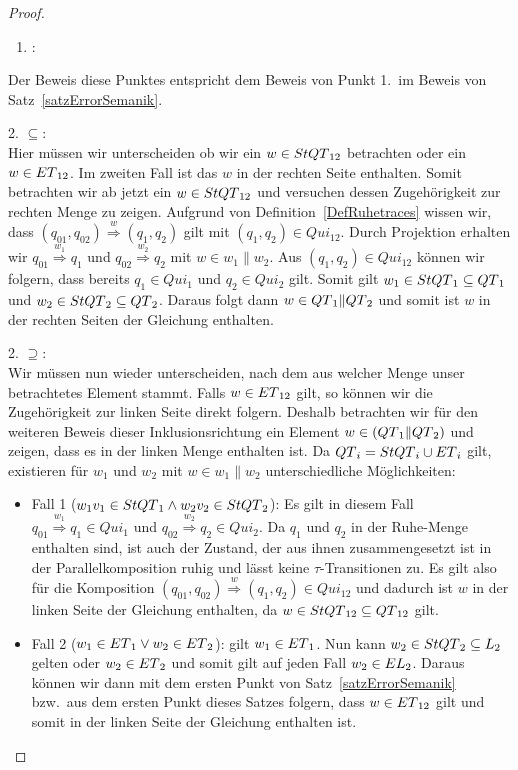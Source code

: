 \begin{proof}
  ~
  \begin{enumerate}
    \item \hspace{-0.2cm}:
  \end{enumerate}
  \vspace{-0.3cm}
  Der Beweis diese Punktes entspricht dem Beweis von Punkt 1.\ im Beweis von
  Satz~\ref{satzErrorSemanik}.

  2. \glqq $\subseteq$\grqq :\\
  Hier müssen wir unterscheiden ob wir ein $w\in StQT{}_{12}$ betrachten oder
  ein $w\in ET{}_{12}$. Im zweiten Fall ist das $w$ in der rechten Seite
  enthalten. Somit betrachten wir ab jetzt ein
  $w\in StQT{}_{12}$ und versuchen dessen Zugehörigkeit zur rechten Menge zu
  zeigen. Aufgrund von Definition~\ref{DefRuhetraces} wissen wir, dass
  $(q_{01},q_{02}) \overset{w}{\Rightarrow} (q_1,q_2)$ gilt mit $(q_1,q_2)\in
  Qui_{12}$. Durch Projektion erhalten wir $q_{01} \overset{w_1}{\Rightarrow}
  q_1$ und $q_{02} \overset{w_2}{\Rightarrow} q_2$ mit $w\in w_1\|w_2$. Aus
  $(q_1,q_2)\in Qui_{12}$ können wir folgern, dass bereits $q_1\in Qui_1$ und
  $q_2\in Qui_2$ gilt. Somit gilt $w_1\in StQT{}_1\subseteq QT{}_1$ und
  $w_2\in StQT{}_2\subseteq QT{}_2$. Daraus folgt dann $w\in
  QT{}_1\|QT{}_2$ und somit ist $w$ in der rechten Seiten der Gleichung
  enthalten.

  2. \glqq $\supseteq$\grqq :\\
  Wir müssen nun wieder unterscheiden, nach dem aus welcher Menge unser
  betrachtetes Element stammt. Falls $w\in ET{}_{12}$ gilt, so können wir die
  Zugehörigkeit zur linken Seite direkt folgern. Deshalb betrachten wir für den
  weiteren Beweis dieser Inklusionsrichtung ein Element $w\in
  (QT{}_1\|QT{}_2)$ und zeigen, dass es in der linken Menge enthalten ist. Da
  $QT{}_i = StQT{}_i\cup ET{}_i$ gilt, existieren für $w_1$ und $w_2$ mit
  $w\in w_1\| w_2$ unterschiedliche Möglichkeiten:
  \begin{itemize}
    \item Fall 1 ($w_1v_1\in StQT{}_1\wedge w_2v_2\in StQT{}_2$): Es gilt in
      diesem Fall $q_{01} \overset{w_1}{\Rightarrow} q_1\in Qui_1$ und $q_{02}
      \overset{w_2}{\Rightarrow} q_2\in Qui_2$. Da $q_1$ und $q_2$ in der
      Ruhe-Menge enthalten sind, ist auch der Zustand, der aus ihnen
      zusammengesetzt ist in der Parallelkomposition ruhig und lässt keine
      $\tau$-Transitionen zu. Es gilt also für die Komposition $(q_{01},q_{02})
      \overset{w}{\Rightarrow} (q_1,q_2)\in Qui_{12}$ und dadurch ist $w$ in
      der linken Seite der Gleichung enthalten, da $w\in StQT{}_{12}\subseteq
      QT{}_{12}$ gilt.
    \item Fall 2 ($w_1\in ET{}_1\vee w_2\in ET{}_2$): \OBdA{} gilt
      $w_1\in ET{}_1$. Nun kann $w_2\in StQT{}_2\subseteq L_2$ gelten
      oder $w_2\in ET{}_2$ und somit gilt auf jeden Fall $w_2\in
      EL{}_2$. Daraus können wir dann mit dem ersten Punkt von
      Satz~\ref{satzErrorSemanik} bzw.\ aus dem ersten Punkt dieses Satzes
      folgern, dass $w\in ET{}_{12}$ gilt und somit in der linken Seite der
      Gleichung enthalten ist.
  \end{itemize}


\end{proof}
